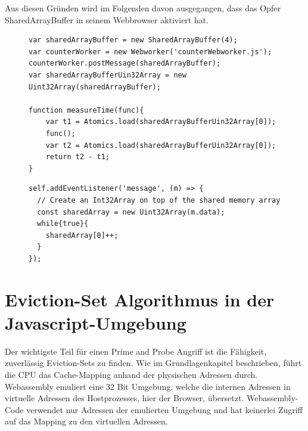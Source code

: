 Aus diesen Gründen wird im Folgenden davon ausgegangen, dass das Opfer SharedArrayBuffer in seinem Webbrowser aktiviert hat.

\begin{figure}[h]
\label{alg_list:sharedArrayBufferWorkerMain}
\begin{lstlisting}[caption=main.js: Code welcher den counterWorker für Zeitmessungen verwendet]
var sharedArrayBuffer = new SharedArrayBuffer(4);
var counterWorker = new Webworker('counterWebworker.js');
counterWorker.postMessage(sharedArrayBuffer);
var sharedArrayBufferUin32Array = new Uint32Array(sharedArrayBuffer);

function measureTime(func){
    var t1 = Atomics.load(sharedArrayBufferUin32Array[0]);
    func();
    var t2 = Atomics.load(sharedArrayBufferUin32Array[0]);
    return t2 - t1;
}
\end{lstlisting}
\end{figure}

\begin{figure}[h]
\label{alg_list:sharedArrayBufferWorker}
\begin{lstlisting}[caption=counterWebworker.js: Webworker welcher die Zählvariable in einer Endlosschleife iteriert]
self.addEventListener('message', (m) => {
  // Create an Int32Array on top of the shared memory array 
  const sharedArray = new Uint32Array(m.data);
  while{true}{
    sharedArray[0]++;
  }
});
\end{lstlisting}
\end{figure}

\section{Eviction-Set Algorithmus in der Javascript-Umgebung}
Der wichtigste Teil für einen Prime and Probe Angriff ist die Fähigkeit, zuverlässig Eviction-Sets zu finden. Wie im Grundlagenkapitel beschrieben, führt die CPU das Cache-Mapping anhand der physischen Adressen durch. Webassembly emuliert eine 32 Bit Umgebung, welche die internen Adressen in virtuelle Adressen des Hostprozesses, hier der Browser, übersetzt. 
Webassembly-Code verwendet nur Adressen der emulierten Umgebung und hat keinerlei Zugriff auf das Mapping zu den virtuellen Adressen. 


